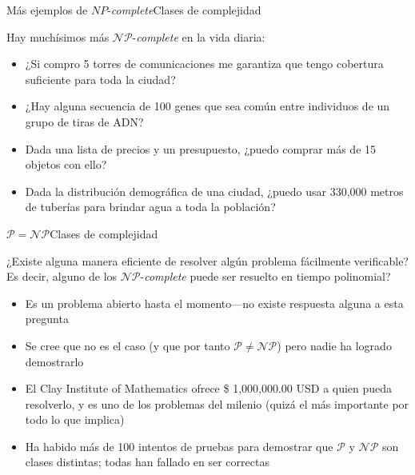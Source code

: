\documentclass[spanish, c]{beamer}
\begin{document}
\begin{frame}{Más ejemplos de \texorpdfstring{$NP$-\textit{complete}}{NP-complete}}{Clases de complejidad}
    
    Hay muchísimos más $\mathcal{NP}$-\textit{complete} en la vida diaria:

    \begin{itemize}
        \itemsep 3.5ex
        \item ¿Si compro 5 torres de comunicaciones me garantiza que tengo cobertura suficiente para toda la ciudad? \pause
        \item ¿Hay alguna secuencia de 100 genes que sea común entre individuos de un grupo de tiras de ADN? \pause
        \item Dada una lista de precios y un presupuesto, ¿puedo comprar más de 15 objetos con ello? \pause
        \item Dada la distribución demográfica de una ciudad, ¿puedo usar 330,000 metros de tuberías para brindar agua a toda la población?
    \end{itemize}

\end{frame}

\begin{frame}{\texorpdfstring{$\mathcal{P} = \mathcal{NP}$}{P = NP}}{Clases de complejidad}

    \begin{center}
        \large
        ¿Existe alguna manera eficiente de resolver algún problema fácilmente verificable?\\
        Es decir, alguno de los $\mathcal{NP}$-\textit{complete} puede ser resuelto en tiempo polinomial?
    \end{center}

    \bigskip

    \begin{itemize}
        \item Es un problema abierto hasta el momento---no existe respuesta alguna a esta pregunta
        \item Se cree que no es el caso (y que por tanto $\mathcal{P} \neq \mathcal{NP}$) pero nadie ha logrado demostrarlo
        \item El Clay Institute of Mathematics ofrece \$ 1,000,000.00 USD a quien pueda resolverlo, y es uno de los problemas del milenio (quizá el más importante por todo lo que implica)
        \item Ha habido más de 100 intentos de pruebas para demostrar que $\mathcal{P}$ y $\mathcal{NP}$ son clases distintas; todas han fallado en ser correctas
    \end{itemize}

\end{frame}



\end{document}
